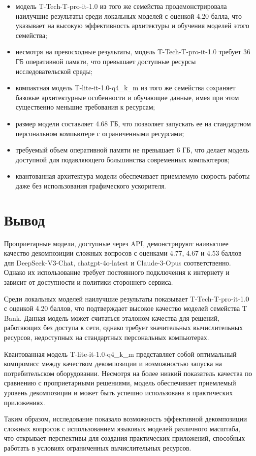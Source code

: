 \begin{itemize}
	\item модель T-Tech-T-pro-it-1.0 из того же семейства продемонстрировала наилучшие результаты среди локальных моделей с оценкой 4.20 балла, что указывает на высокую эффективность архитектуры и обучения моделей этого семейства;
	
	\item несмотря на превосходные результаты, модель T-Tech-T-pro-it-1.0 требует 36 ГБ оперативной памяти, что превышает доступные ресурсы исследовательской среды;
	
	\item компактная модель T-lite-it-1.0-q4\_k\_m из того же семейства сохраняет базовые архитектурные особенности и обучающие данные, имея при этом существенно меньшие требования к ресурсам;
	
	\item размер модели составляет 4.68 ГБ, что позволяет запускать ее на стандартном персональном компьютере с ограниченными ресурсами;
	
	\item требуемый объем оперативной памяти не превышает 6 ГБ, что делает модель доступной для подавляющего большинства современных компьютеров;
	
	\item квантованная архитектура модели обеспечивает приемлемую скорость работы даже без использования графического ускорителя. \cite{t_lite_it_q4}
\end{itemize}


\section{Вывод}
Проприетарные модели, доступные через API, демонстрируют наивысшее качество декомпозиции сложных вопросов с оценками 4.77, 4.67 и 4.53 баллов для DeepSeek-V3-Chat, chatgpt-4o-latest и Claude-3-Opus соответственно. Однако их использование требует постоянного подключения к интернету и зависит от доступности и политики стороннего сервиса.

Среди локальных моделей наилучшие результаты показывает T-Tech-T-pro-it-1.0 с оценкой 4.20 баллов, что подтверждает высокое качество моделей семейства T Bank. Данная модель может считаться эталоном качества для решений, работающих без доступа к сети, однако требует значительных вычислительных ресурсов, недоступных на стандартных персональных компьютерах.

Квантованная модель T-lite-it-1.0-q4\_k\_m представляет собой оптимальный компромисс между качеством декомпозиции и возможностью запуска на потребительском оборудовании. Несмотря на более низкий показатель качества по сравнению с проприетарными решениями, модель обеспечивает приемлемый уровень декомпозиции и может быть успешно использована в практических приложениях.

Таким образом, исследование показало возможность эффективной декомпозиции сложных вопросов с использованием языковых моделей различного масштаба, что открывает перспективы для создания практических приложений, способных работать в условиях ограниченных вычислительных ресурсов.
